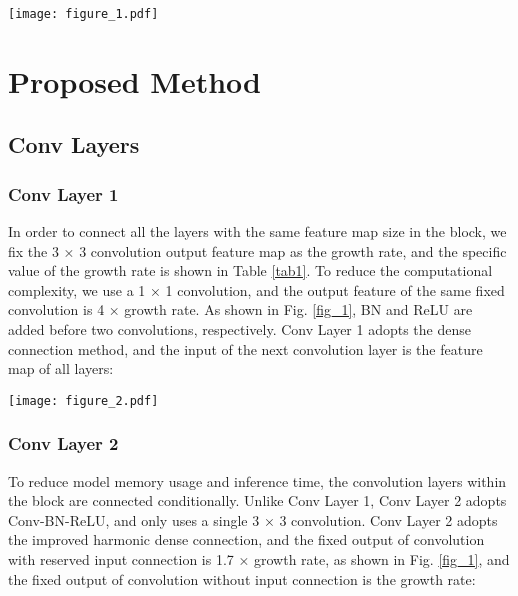 \documentclass[default,iicol]{sn-jnl}
\theoremstyle{thmstyleone}\newtheorem{theorem}{Theorem}\newtheorem{proposition}[theorem]{Proposition}
\theoremstyle{thmstyletwo}\newtheorem{example}{Example}\newtheorem{remark}{Remark}
\theoremstyle{thmstylethree}\newtheorem{definition}{Definition}
\begin{document}
\begin{figure*}[h]
  \centering
  \texttt{[image: figure\_1.pdf]}
  \caption{Three convolution layers are used by TripleNet: (a) Conv Layer 1, using dense connections, (b) Conv Layer 2, using harmonic dense connections, (c) Conv Layer 3, using residual learning.}
  \label{fig_1}
\end{figure*}

\section{Proposed Method}
\subsection{Conv Layers}
\subsubsection{Conv Layer 1}
In order to connect all the layers with the same feature map size in the block, we fix the 3 × 3 convolution output feature map as the growth rate, and the specific value of the growth rate is shown in Table \ref{tab1}. To reduce the computational complexity, we use a 1 × 1 convolution, and the output feature of the same fixed convolution is 4 × growth rate. As shown in Fig. \ref{fig_1}, BN \cite{ioffe2015batch} and ReLU \cite{glorot2011deep} are added before two convolutions, respectively. Conv Layer 1 adopts the dense connection method, and the input of the next convolution layer is the feature map of all layers:



\begin{algorithm}
\caption{Conv Layer 2}
\label{algo}
\begin{algorithmic}[1]
    \State{}
    \State{)}
    \EndFor
\EndFor
{}
\EndFor
\end{algorithmic}
\end{algorithm}

\begin{figure*}[h]
  \centering
  \texttt{[image: figure\_2.pdf]}
  \caption{The overall architecture of TripleNet.}
  \label{fig_2}
\end{figure*}

\subsubsection{Conv Layer 2}
To reduce model memory usage and inference time, the convolution layers within the block are connected conditionally. Unlike Conv Layer 1, Conv Layer 2 adopts Conv-BN-ReLU, and only uses a single 3 × 3 convolution. Conv Layer 2 adopts the improved harmonic dense connection, and the fixed output of convolution with reserved input connection is 1.7 × growth rate, as shown in Fig. \ref{fig_1}, and the fixed output of convolution without input connection is the growth rate:
\end{document}
